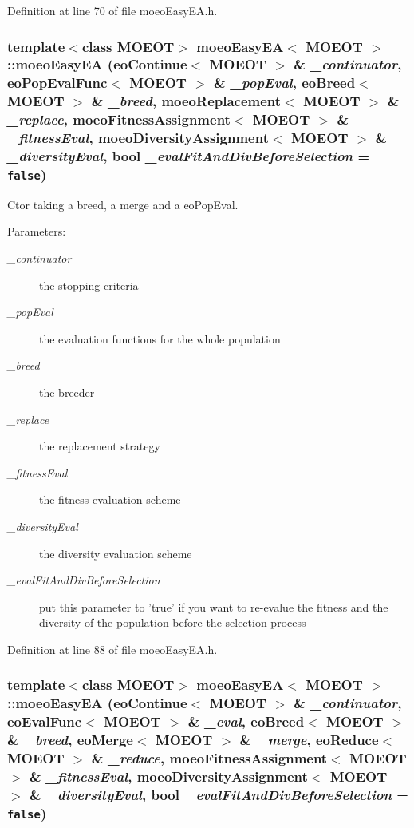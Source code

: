 Definition at line 70 of file moeo\-Easy\-EA.h.
\subsubsection{\setlength{\rightskip}{0pt plus 5cm}template$<$class MOEOT$>$ \bf{moeo\-Easy\-EA}$<$ MOEOT $>$::\bf{moeo\-Easy\-EA} (\bf{eo\-Continue}$<$ MOEOT $>$ \& {\em \_\-continuator}, \bf{eo\-Pop\-Eval\-Func}$<$ MOEOT $>$ \& {\em \_\-pop\-Eval}, \bf{eo\-Breed}$<$ MOEOT $>$ \& {\em \_\-breed}, \bf{moeo\-Replacement}$<$ MOEOT $>$ \& {\em \_\-replace}, \bf{moeo\-Fitness\-Assignment}$<$ MOEOT $>$ \& {\em \_\-fitness\-Eval}, \bf{moeo\-Diversity\-Assignment}$<$ MOEOT $>$ \& {\em \_\-diversity\-Eval}, bool {\em \_\-eval\-Fit\-And\-Div\-Before\-Selection} = {\tt false})\hspace{0.3cm}{\tt  [inline]}}\label{classmoeoEasyEA_6cdebc72ce0134ce1680dafdf94740a1}


Ctor taking a breed, a merge and a eo\-Pop\-Eval. 

\begin{Desc}
\item[Parameters:]
\begin{description}
\item[{\em \_\-continuator}]the stopping criteria \item[{\em \_\-pop\-Eval}]the evaluation functions for the whole population \item[{\em \_\-breed}]the breeder \item[{\em \_\-replace}]the replacement strategy \item[{\em \_\-fitness\-Eval}]the fitness evaluation scheme \item[{\em \_\-diversity\-Eval}]the diversity evaluation scheme \item[{\em \_\-eval\-Fit\-And\-Div\-Before\-Selection}]put this parameter to 'true' if you want to re-evalue the fitness and the diversity of the population before the selection process \end{description}
\end{Desc}


Definition at line 88 of file moeo\-Easy\-EA.h.
\subsubsection{\setlength{\rightskip}{0pt plus 5cm}template$<$class MOEOT$>$ \bf{moeo\-Easy\-EA}$<$ MOEOT $>$::\bf{moeo\-Easy\-EA} (\bf{eo\-Continue}$<$ MOEOT $>$ \& {\em \_\-continuator}, \bf{eo\-Eval\-Func}$<$ MOEOT $>$ \& {\em \_\-eval}, \bf{eo\-Breed}$<$ MOEOT $>$ \& {\em \_\-breed}, \bf{eo\-Merge}$<$ MOEOT $>$ \& {\em \_\-merge}, \bf{eo\-Reduce}$<$ MOEOT $>$ \& {\em \_\-reduce}, \bf{moeo\-Fitness\-Assignment}$<$ MOEOT $>$ \& {\em \_\-fitness\-Eval}, \bf{moeo\-Diversity\-Assignment}$<$ MOEOT $>$ \& {\em \_\-diversity\-Eval}, bool {\em \_\-eval\-Fit\-And\-Div\-Before\-Selection} = {\tt false})\hspace{0.3cm}{\tt  [inline]}}\label{classmoeoEasyEA_65c1069eeed979ca433e6caee3b5e942}


